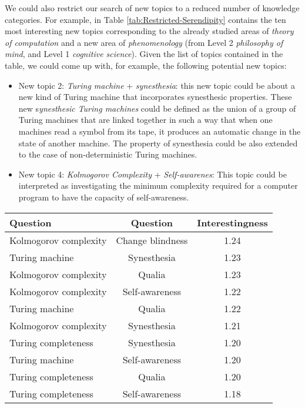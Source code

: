 We could also restrict our search of new topics to a reduced number
of knowledge categories. For example, in Table \ref{tab:Restricted-Serendipity}
contains the ten most interesting new topics corresponding to the
already studied areas of \emph{theory of computation} and a new area
of \emph{phenomenology} (from Level 2 \emph{philosophy of mind}, and
Level 1 \emph{cognitive science}). Given the list of topics contained
in the table, we could come up with, for example, the following potential
new topics:
\begin{itemize}
\item New topic 2:\emph{ Turing machine} + \emph{synesthesia}: this new
topic could be about a new kind of Turing machine that incorporates
synesthesic properties. These new s\emph{ynesthesic Turing machines}
could be defined as the union of a group of Turing machines that are
linked together in such a way that when one machines read a symbol
from its tape, it produces an automatic change in the state of another
machine. The property of synesthesia could be also extended to the
case of non-deterministic Turing machines.
\item New topic 4:\emph{ Kolmogorov Complexity} + \emph{Self-awarenes}:
This topic could be interpreted as investigating the minimum complexity
required for a computer program to have the capacity of self-awareness.
\end{itemize}
\begin{table*}
\begin{centering}
\begin{tabular}{|l|c|c|}
\hline 
{Question} & Question & Interestingness\tabularnewline
\hline 
\hline 
Kolmogorov complexity & Change blindness & 1.24\tabularnewline
\hline 
{Turing machine} & Synesthesia & 1.23\tabularnewline
\hline 
Kolmogorov complexity & Qualia & 1.23\tabularnewline
\hline 
Kolmogorov complexity & Self-awareness & 1.22\tabularnewline
\hline 
Turing machine & Qualia & 1.22\tabularnewline
\hline 
Kolmogorov complexity & Synesthesia & 1.21\tabularnewline
\hline 
Turing completeness & Synesthesia & 1.20\tabularnewline
\hline 
Turing machine & Self-awareness & 1.20\tabularnewline
\hline 
Turing completeness & Qualia & 1.20\tabularnewline
\hline 
Turing completeness & Self-awareness & 1.18\tabularnewline
\hline 
\end{tabular}
\par\end{centering}

\caption{\label{tab:Restricted-Serendipity}Restricted New Topics}
\end{table*}

